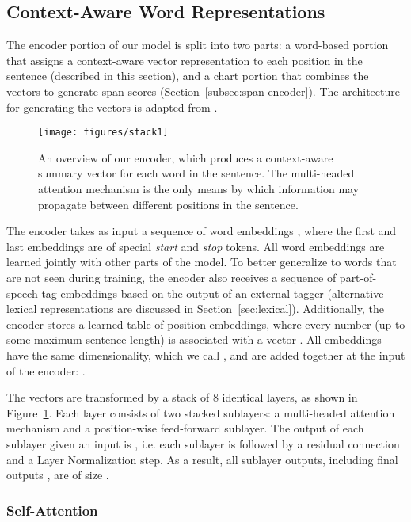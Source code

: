 \documentclass[11pt,a4paper]{article}
\begin{document}
\subsection{Context-Aware Word Representations}
\label{subsec:linear-encoder}

The encoder portion of our model is split into two parts: a word-based portion that assigns a context-aware vector representation  to each position  in the sentence (described in this section), and a chart portion that combines the vectors  to generate span scores  (Section~\ref{subsec:span-encoder}). The architecture for generating the vectors  is adapted from \citet{vaswani_attention_2017}.

\begin{figure}
  \centering
    \texttt{[image: figures/stack1]}
    \caption{An overview of our encoder, which produces a context-aware summary vector for each word in the sentence. The multi-headed attention mechanism is the only means by which information may propagate between different positions in the sentence.}
    \label{fig:linear-encoder}
\end{figure}

The encoder takes as input a sequence of word embeddings , where the first and last embeddings are of special \emph{start} and \emph{stop} tokens. All word embeddings are learned jointly with other parts of the model. To better generalize to words that are not seen during training, the encoder also receives a sequence of part-of-speech tag embeddings  based on the output of an external tagger (alternative lexical representations are discussed in Section~\ref{sec:lexical}). Additionally, the encoder stores a learned table of position embeddings, where every number  (up to some maximum sentence length) is associated with a vector . All embeddings have the same dimensionality, which we call , and are added together at the input of the encoder: .

The vectors  are transformed by a stack of 8 identical layers, as shown in Figure~\ref{fig:linear-encoder}. Each layer consists of two stacked sublayers: a multi-headed attention mechanism and a position-wise feed-forward sublayer. The output of each sublayer given an input  is , i.e. each sublayer is followed by a residual connection and a Layer Normalization \citep{ba_layer_2016} step.
As a result, all sublayer outputs, including final outputs , are of size .

\subsubsection{Self-Attention}
\label{subsec:self-attention}
\end{document}
